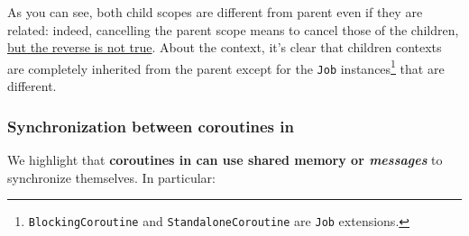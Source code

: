 As you can see, both child scopes are different from parent even if they are related: indeed, cancelling the parent scope means to cancel those of the children, \uline{ but the reverse is not true}.
About the context, it's clear that children contexts are completely inherited from the parent except for the \texttt{Job} instances\footnote{\texttt{BlockingCoroutine} and \texttt{StandaloneCoroutine} are \texttt{Job} extensions.} that are different.

\subsubsection{Synchronization between coroutines in \Kotlin}

We highlight that \textbf{coroutines in \Kotlin can use shared memory or \textit{messages}} to synchronize themselves. In particular:
